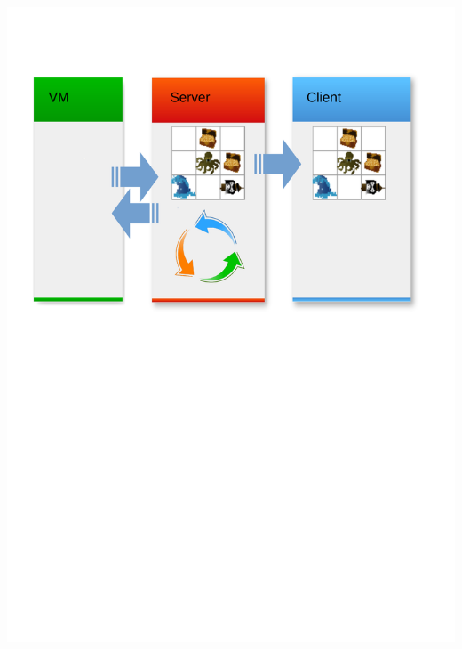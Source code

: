 \begin{frame}
	\begin{center}
		\includegraphics[scale=0.5]{simulation/Simulation4.pdf}
	\end{center}
\end{frame}

